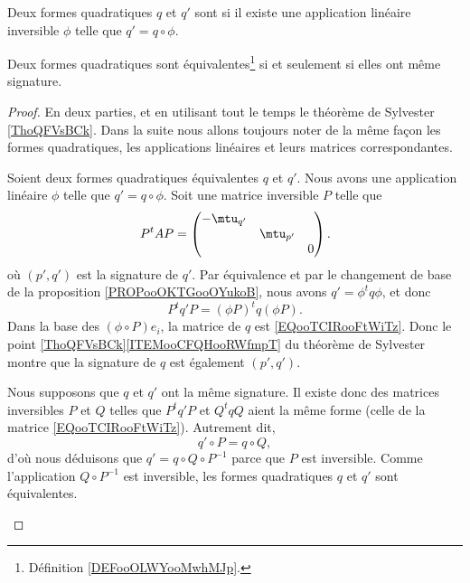 \begin{definition}        \label{DEFooOLWYooMwhMJp}
	Deux formes quadratiques \( q\) et \( q'\) sont  si il existe une application linéaire inversible \( \phi\) telle que \( q'=q\circ \phi\).
\end{definition}

\begin{proposition}       \label{PROPooBWXMooLsgyKm}
	Deux formes quadratiques sont équivalentes\footnote{Définition \ref{DEFooOLWYooMwhMJp}.} si et seulement si elles ont même signature.
\end{proposition}

\begin{proof}
	En deux parties, et en utilisant tout le temps le théorème de Sylvester \ref{ThoQFVsBCk}. Dans la suite nous allons toujours noter de la même façon les formes quadratiques, les applications linéaires et leurs matrices correspondantes.

	\begin{subproof}
		\spitem[\( \Rightarrow\)]
		Soient deux formes quadratiques équivalentes \( q\) et \( q'\). Nous avons une application linéaire \( \phi\) telle que \( q'=q\circ \phi\). Soit une matrice inversible \( P\) telle que
		\begin{equation}		\label{EQooTCIRooFtWiTz}
			P^tAP=\begin{pmatrix}
				-\mtu_{q'} &           &   \\
				           & \mtu_{p'} &   \\
				           &           & 0
			\end{pmatrix}.
		\end{equation}
		où \( (p',q')\) est la signature de \( q'\). Par équivalence et par le changement de base de la proposition \ref{PROPooOKTGooOYukoB}, nous avons \( q'=\phi^t q\phi\), et donc
		\begin{equation}
			P^tq'P =	(\phi P)^tq(\phi P).
		\end{equation}
		Dans la base des \( (\phi\circ P)e_i\), la matrice de \( q\) est \eqref{EQooTCIRooFtWiTz}. Donc le point \ref{ThoQFVsBCk}\ref{ITEMooCFQHooRWfmpT} du théorème de Sylvester montre que la signature de \( q\) est également \( (p',q')\).

		\spitem[\( \Rightarrow\)]
		Nous supposons que \( q\) et \( q'\) ont la même signature. Il existe donc des matrices inversibles \( P\) et \( Q\) telles que \( P^tq'P\) et \( Q^tqQ\) aient la même forme (celle de la matrice \eqref{EQooTCIRooFtWiTz}). Autrement dit,
		\begin{equation}
			q'\circ P=q\circ Q,
		\end{equation}
		d'où nous déduisons que \( q'=q\circ Q\circ P^{-1}\) parce que \( P\) est inversible. Comme l'application \( Q\circ P^{-1}\) est inversible, les formes quadratiques \( q\) et \( q'\) sont équivalentes.
	\end{subproof}
\end{proof}


